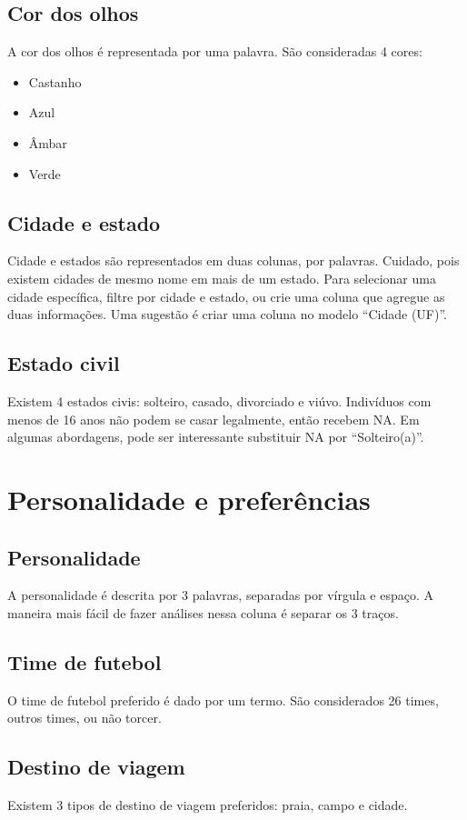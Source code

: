\documentclass{book}
\begin{document}
\subsection{Cor dos olhos}
A cor dos olhos é representada por uma palavra. São consideradas 4 cores:
\begin{itemize}
  \item Castanho
  \item Azul
  \item Âmbar
  \item Verde
\end{itemize}

\subsection{Cidade e estado}
Cidade e estados são representados em duas colunas, por palavras. Cuidado, pois existem cidades de mesmo nome em mais de um estado. Para selecionar uma cidade específica, filtre por cidade e estado, ou crie uma coluna que agregue as duas informações. Uma sugestão é criar uma coluna no modelo ``Cidade (UF)''.

\subsection{Estado civil}
Existem 4 estados civis: solteiro, casado, divorciado e viúvo. Indivíduos com menos de 16 anos não podem se casar legalmente, então recebem NA. Em algumas abordagens, pode ser interessante substituir NA por ``Solteiro(a)''.

\section{Personalidade e preferências}

\subsection{Personalidade}
A personalidade é descrita por 3 palavras, separadas por vírgula e espaço. A maneira mais fácil de fazer análises nessa coluna é separar os 3 traços.

\subsection{Time de futebol}
O time de futebol preferido é dado por um termo. São considerados 26 times, outros times, ou não torcer.

\subsection{Destino de viagem}
Existem 3 tipos de destino de viagem preferidos: praia, campo e cidade.
\end{document}
